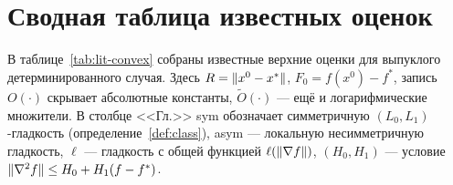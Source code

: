 \clearpage
\section{Сводная таблица известных оценок}\label{app:literature}
 

В таблице~\ref{tab:lit-convex} собраны известные верхние оценки для выпуклого детерминированного случая. Здесь $R=\|x^0-x^\ast\|$, $F_0=f(x^0)-f^\ast$, запись $O(\cdot)$ скрывает абсолютные константы, $\widetilde O(\cdot)$ --- ещё и логарифмические множители. В столбце <<Гл.>> sym обозначает симметричную $(L_0,L_1)$-гладкость (определение~\ref{def:class}), asym --- локальную несимметричную гладкость, $\ell$ --- гладкость с общей функцией $\ell(\|\nabla f\|)$, $(H_0,H_1)$ --- условие $\|\nabla^2f\|\le H_0+H_1(f-f^\ast)$.

